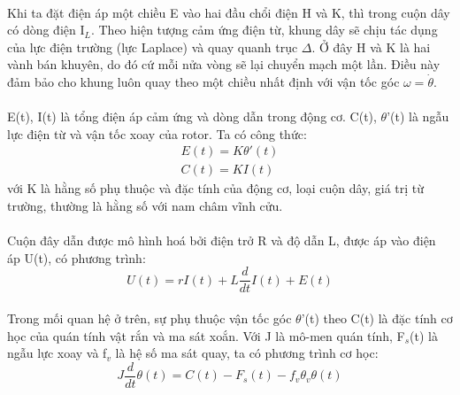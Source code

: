 \paragraph{}Khi ta đặt điện áp một chiều E vào hai đầu chổi điện H và K, thì trong cuộn dây có dòng điện I$_{L}$. Theo hiện tượng cảm ứng điện từ, khung dây sẽ chịu tác dụng của lực điện trường (lực Laplace) và quay quanh trục $\Delta$. Ở đây H và K là hai vành bán khuyên, do đó cứ mỗi nửa vòng sẽ lại chuyển mạch một lần. Điều này đảm bảo cho khung luôn quay theo một chiều nhất định với vận tốc góc $\omega = \dot{\theta}$.
\paragraph{}E(t), I(t) là tổng điện áp cảm ứng và dòng dẫn trong động cơ. C(t), $\theta$'(t) là ngẫu lực điện từ và vận tốc xoay của rotor. Ta có công thức:
\begin{align}
E(t) = K\theta'(t)
\\
C(t) = KI(t)
\end{align}
với K là hằng số phụ thuộc và đặc tính của động cơ, loại cuộn dây, giá trị từ trường, thường là hằng số với nam châm vĩnh cửu. 
\paragraph{}Cuộn đây dẫn được mô hình hoá bởi điện trở R và độ dẫn L, được áp vào điện áp U(t), có phương trình:
\begin{equation}
U(t) = rI(t) + L\dfrac{d}{dt}I(t) + E(t)
\end{equation}
\paragraph{}Trong mối quan hệ ở trên, sự phụ thuộc vận tốc góc $\theta$'(t) theo C(t) là đặc tính cơ học của quán tính vật rắn và ma sát xoắn. Với J là mô-men quán tính, F$_{s}$(t) là ngẫu lực xoay và f$_{v}$ là hệ số ma sát quay, ta có phương trình cơ học:
\begin{equation}
J\dfrac{d}{dt}\theta(t) = C(t) - F_{s}(t) - f_{v}\theta_{v}\theta(t)
\end{equation}